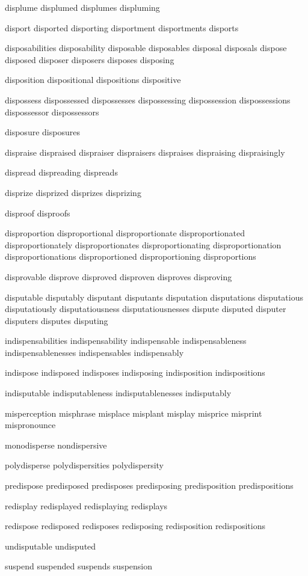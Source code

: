 \begin{itemize}
displume displumed displumes displuming

disport disported disporting disportment disportments disports

disposabilities disposability disposable disposables disposal disposals dispose disposed disposer disposers disposes disposing

disposition dispositional dispositions dispositive

dispossess dispossessed dispossesses dispossessing dispossession dispossessions dispossessor dispossessors

disposure disposures

dispraise dispraised dispraiser dispraisers dispraises dispraising dispraisingly

dispread dispreading dispreads

disprize disprized disprizes disprizing

disproof disproofs

disproportion disproportional disproportionate disproportionated disproportionately disproportionates disproportionating disproportionation disproportionations disproportioned disproportioning disproportions

disprovable disprove disproved disproven disproves disproving

disputable disputably disputant disputants disputation disputations disputatious disputatiously disputatiousness disputatiousnesses dispute disputed disputer disputers disputes disputing

indispensabilities indispensability indispensable indispensableness indispensablenesses indispensables indispensably

indispose indisposed indisposes indisposing indisposition indispositions

indisputable indisputableness indisputablenesses indisputably

misperception misphrase misplace misplant misplay misprice misprint mispronounce 

monodisperse nondispersive

polydisperse polydispersities polydispersity

predispose predisposed predisposes predisposing predisposition predispositions

redisplay redisplayed redisplaying redisplays

redispose redisposed redisposes redisposing redisposition redispositions

undisputable undisputed

suspend suspended suspends suspension


\end{itemize}



